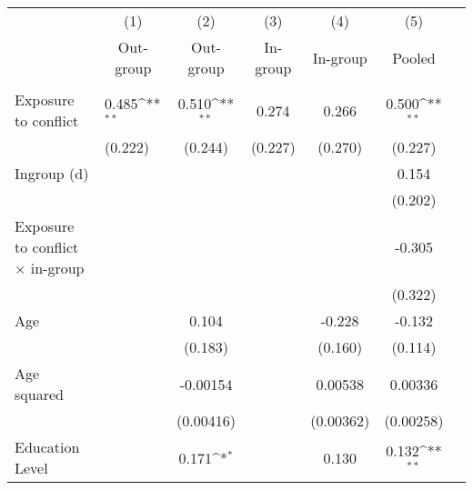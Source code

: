 {
\def\sym#1{\ifmmode^{#1}\else\(^{#1}\)\fi}
\begin{tabularx}{0.9\textwidth}{Xl*{5}{c}}
\hline\hline
                    &\multicolumn{1}{c}{(1)}&\multicolumn{1}{c}{(2)}&\multicolumn{1}{c}{(3)}&\multicolumn{1}{c}{(4)}&\multicolumn{1}{c}{(5)}\\
                    &\multicolumn{1}{c}{Out-group}&\multicolumn{1}{c}{Out-group}&\multicolumn{1}{c}{In-group}&\multicolumn{1}{c}{In-group}&\multicolumn{1}{c}{Pooled}\\
\hline
                    &                     &                     &                     &                     &                     \\
Exposure to conflict&       0.485\sym{**} &       0.510\sym{**} &       0.274         &       0.266         &       0.500\sym{**} \\
                    &     (0.222)         &     (0.244)         &     (0.227)         &     (0.270)         &     (0.227)         \\
[0.5em]
Ingroup (d)         &                     &                     &                     &                     &       0.154         \\
                    &                     &                     &                     &                     &     (0.202)         \\
[0.5em]
Exposure to conflict × in-group&                     &                     &                     &                     &      -0.305         \\
                    &                     &                     &                     &                     &     (0.322)         \\
[0.5em]
Age                 &                     &       0.104         &                     &      -0.228         &      -0.132         \\
                    &                     &     (0.183)         &                     &     (0.160)         &     (0.114)         \\
[0.5em]
Age squared         &                     &    -0.00154         &                     &     0.00538         &     0.00336         \\
                    &                     &   (0.00416)         &                     &   (0.00362)         &   (0.00258)         \\
[0.5em]
Education Level     &                     &       0.171\sym{*}  &                     &       0.130         &       0.132\sym{**} \\

\end{tabularx}}
